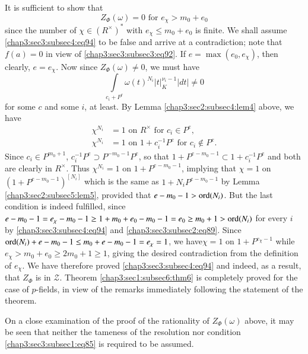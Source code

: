 It is sufficient to show that
\begin{equation*}
  Z_{\Phi}(\omega)=0\text{ \ for \ }
  e_{\chi}>m_{0}+e_{0}\tag{94}\label{chap3:sec3:subsec4:eq94} 
\end{equation*}
since the number of $\chi\in(R^{\times})^{\ast}$ with $e_{\chi}\leq
m_{0}+e_{0}$ is finite. We shall assume \ref{chap3:sec3:subsec4:eq94}
to be false and 
arrive at a contradiction; note that $f(a)=0$ in view of
\ref{chap3:sec3:subsec3:eq92}. If $e=\max (e_{0},e_{\chi})$, then clearly,
$e=e_{\chi}$. Now since $Z_{\Phi}(\omega)\neq 0$, we must have
$$
\int\limits_{c_{i}+P^{e}}\omega(t)^{N_{i}}|t|^{\nu_{i}-1}_{K}|dt|\neq
0
$$
for some $c$ and some $i$, at least. By Lemma
\ref{chap3:sec2:subsec4:lem4} above, we have
\begin{align*}
  \chi^{N_{i}} &= 1\text{ on  } R^{\times}\text{ for } c_{i}\in
  P^{e},\\
  \chi^{N_{i}} &= 1\text{ on } 1+c^{-1}_{i}P^{e}\text{ for }
  c_{i}\not\in P^{e}.
\end{align*}
Since $c_{i}\in P^{m_{0}+1}$, $c^{-1}_{i}P^{e}\supset
P^{-m_{0}-1}P^{e}$, so that $1+P^{e-m_{0}-1}\subset 1+c^{-1}_{i}P^{e}$
and both are clearly in $R^{\times}$. Thus $\chi^{N_{i}}=1$ on
$1+P^{e-m_{0}-1}$, implying that $\chi=1$ on
$(1+P^{e-m_{0}-1})^{[N_{i}]}$ which is the same as
$1+N_{i}P^{e-m_{0}-1}$ by Lemma \ref{chap3:sec2:subsec5:lem5}, provided that
$e-m_{0}-1>\operatorname{ord}(N_{i})$. But the last condition is indeed fulfilled,
since $e-m_{0}-1=e_{\chi}-m_{0}-1\geq 1+m_{0}+e_{0}-m_{0}-1=e_{0}\geq
m_{0}+1>\operatorname{ord}(N_{i})$ for every $i$ by \ref{chap3:sec3:subsec4:eq94}
and \ref{chap3:sec3:subsec2:eq89}. Since 
$\operatorname{ord}(N_{i})+e-m_{0}-1\leq m_{0}+e-m_{0}-1=e_{\chi}=1$, we
have\pageoriginale $\chi=1$ on $1+P^{e_{\chi}-1}$ while
$e_{\chi}>m_{0}+e_{0}\geq 2m_{0}+1\geq 1$, giving the desired
contradiction from the definition of $e_{\chi}$. We have therefore
proved \ref{chap3:sec3:subsec4:eq94} and indeed, as a result, that
$Z_{\Phi}$ is in 
$\mathscr{Z}$. Theorem \ref{chap3:sec1:subsec6:thm6} is completely proved for the case
of $p$-fields, in view of the remarks immediately following the
statement of the theorem.

\begin{Remark*}
  On a close examination of the proof of the rationality of
  $Z_{\Phi}(\omega)$ above, it may be seen that neither the tameness of
  the resolution nor condition \ref{chap3:sec3:subsec1:eq85} is required to be assumed.
\end{Remark*}

